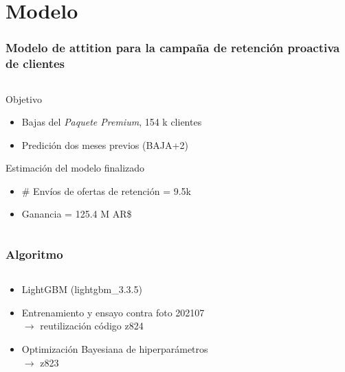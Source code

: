 \documentclass[aspectratio=169]{beamer} %
\begin{document}
\section{Modelo}

\begin{frame}
  \frametitle{Modelo de attition para la campaña de retención proactiva de clientes}
  \begin{columns}[onlytextwidth]
    \begin{column}{.6\textwidth}
      \begin{block}{Objetivo}
        \begin{itemize}
          \item Bajas del \emph{Paquete Premium}, 154 k clientes
          \item Predición dos meses previos (BAJA+2)
		    \end{itemize}
      \end{block}
 
      \begin{block}{Estimación del modelo finalizado}
        \begin{itemize}
          \item \# Envíos de ofertas de retención = 9.5k 
			    \item Ganancia = 125.4 M AR\$
		    \end{itemize}
      \end{block}
    \end{column}
  \end{columns}
\end{frame}



\begin{frame}
  \frametitle{Algoritmo}
  \begin{columns}[onlytextwidth]
    \begin{column}{.6\textwidth}
      \begin{block}{}
        \begin{itemize}
			    \item LightGBM {\tiny (lightgbm\_3.3.5) }%
			    \item Entrenamiento y ensayo contra foto 202107\\
			    $\rightarrow$ reutilización código z824 
			    \item Optimización Bayesiana de hiperparámetros\\
			    $\rightarrow$ z823 
		    \end{itemize}
      \end{block}
    \end{column}
  \end{columns}
\end{frame}
\end{document}
